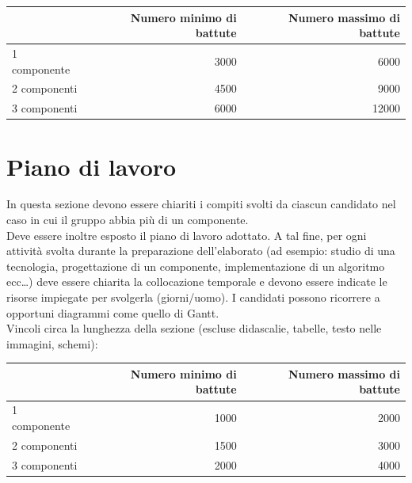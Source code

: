 \documentclass[12pt]{article}
\begin{document}
\vspace{1cm}
\begin{tabular}{l|rr}
 & Numero minimo di battute & Numero massimo di battute \\
 \hline
 1 componente & 3000 & 6000 \\
 2 componenti & 4500 & 9000 \\
 3 componenti & 6000 & 12000 \\
 \hline
\end{tabular}


\newpage



\section{Piano di lavoro}

In questa sezione devono essere chiariti i compiti svolti da ciascun candidato nel caso in cui il gruppo abbia più di un componente.\\

Deve essere inoltre esposto il piano di lavoro adottato. A tal fine, per ogni attività svolta durante la preparazione dell'elaborato (ad esempio: studio di una tecnologia, progettazione di un componente, implementazione di un algoritmo ecc…) deve essere chiarita la collocazione temporale e devono essere indicate le risorse impiegate per svolgerla (giorni/uomo). I candidati possono ricorrere a opportuni diagrammi come quello di Gantt.\\


Vincoli circa la lunghezza della sezione (escluse didascalie, tabelle, testo nelle immagini, schemi):

\vspace{1cm}
\begin{tabular}{l|rr}
 & Numero minimo di battute & Numero massimo di battute \\
 \hline
 1 componente & 1000 & 2000 \\
 2 componenti & 1500 & 3000 \\
 3 componenti & 2000 & 4000 \\
 \hline
\end{tabular}

\newpage


\end{document}
